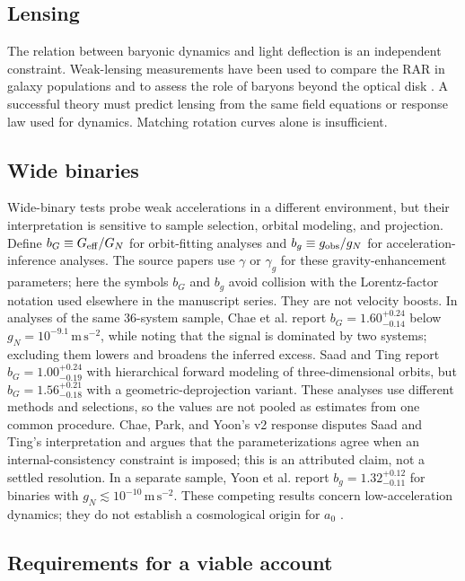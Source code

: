 \documentclass[12pt]{article}
\begin{document}
\subsection{Lensing}

The relation between baryonic dynamics and light deflection is an independent constraint. Weak-lensing measurements have been used to compare the RAR in galaxy populations and to assess the role of baryons beyond the optical disk \cite{Brouwer}. A successful theory must predict lensing from the same field equations or response law used for dynamics. Matching rotation curves alone is insufficient.

\subsection{Wide binaries}

Wide-binary tests probe weak accelerations in a different environment, but their interpretation is sensitive to sample selection, orbital modeling, and projection. Define $b_G\equiv G_{\rm eff}/G_N$ for orbit-fitting analyses and $b_g\equiv g_{\rm obs}/g_N$ for acceleration-inference analyses. The source papers use $\gamma$ or $\gamma_g$ for these gravity-enhancement parameters; here the symbols $b_G$ and $b_g$ avoid collision with the Lorentz-factor notation used elsewhere in the manuscript series. They are not velocity boosts. In analyses of the same 36-system sample, Chae et al. report $b_G=1.60_{-0.14}^{+0.24}$ below $g_N=10^{-9.1}\,\mathrm{m\,s^{-2}}$, while noting that the signal is dominated by two systems; excluding them lowers and broadens the inferred excess. Saad and Ting report $b_G=1.00_{-0.19}^{+0.24}$ with hierarchical forward modeling of three-dimensional orbits, but $b_G=1.56_{-0.18}^{+0.21}$ with a geometric-deprojection variant. These analyses use different methods and selections, so the values are not pooled as estimates from one common procedure. Chae, Park, and Yoon's v2 response disputes Saad and Ting's interpretation and argues that the parameterizations agree when an internal-consistency constraint is imposed; this is an attributed claim, not a settled resolution. In a separate sample, Yoon et al. report $b_g=1.32_{-0.11}^{+0.12}$ for binaries with $g_N\lesssim10^{-10}\,\mathrm{m\,s^{-2}}$. These competing results concern low-acceleration dynamics; they do not establish a cosmological origin for $a_0$ \cite{YoonWide,ChaeWide,SaadTing,ChaeResponse}.

\subsection{Requirements for a viable account}
\end{document}
